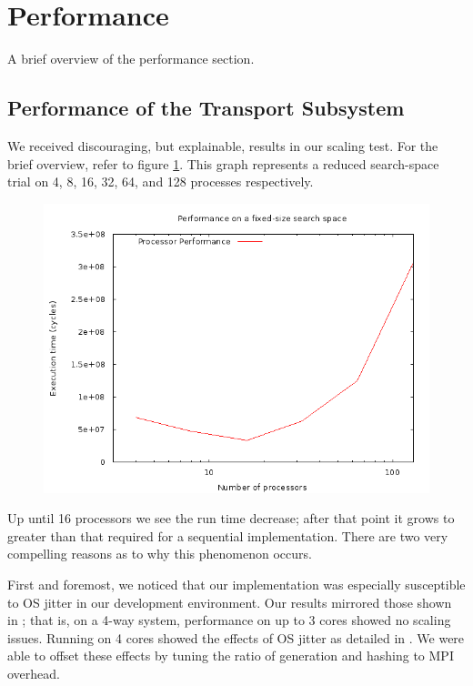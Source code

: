 \section{Performance}
A brief overview of the performance section.

\subsection{Performance of the Transport Subsystem}
\label{sec::performance::transport}
We received discouraging, but explainable, results in our scaling test.  For the
brief overview, refer to figure \ref{fig::performance::transport::procs-time}.
This graph represents a reduced search-space trial on 4, 8, 16, 32, 64, and 128
processes respectively.

\begin{figure}[htp]
\begin{centering}
\includegraphics[height=.25\textheight]{strong-scaling.png}
\label{fig::performance::transport::procs-time}
\end{centering}
\end{figure}

Up until 16 processors we see the run time decrease; after that point it grows
to greater than that required for a sequential implementation.  There are two
very compelling reasons as to why this phenomenon occurs.

First and foremost, we noticed that our implementation was especially
susceptible to OS jitter in our development environment.  Our results mirrored
those shown in \cite{petrini}; that is, on a 4-way system, performance on up to
3 cores showed no scaling issues.  Running on 4 cores showed the effects of OS
jitter as detailed in \cite{petrini}.  We were able to offset these effects by
tuning the ratio of generation and hashing to MPI overhead.

